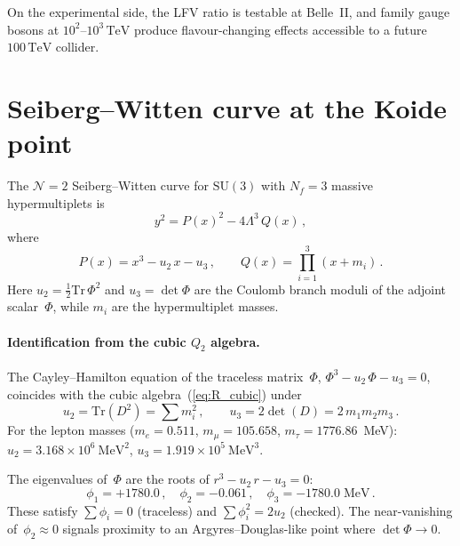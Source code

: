 \documentclass[12pt,a4paper]{article}
\newcommand{\SU}{\mathrm{SU}}
\newcommand{\Nf}{N_{\!f}}
\newcommand{\TeV}{\,\mathrm{TeV}}
\begin{document}
On the experimental side, the LFV ratio is testable at Belle~II,
and family gauge bosons at $10^2$--$10^3\TeV$ produce
flavour-changing effects accessible to a future $100\TeV$ collider.


\appendix

\section{Seiberg--Witten curve at the Koide point}
\label{app:SW}

The $\mathcal{N}{=}2$ Seiberg--Witten curve for $\SU(3)$ with
$\Nf = 3$ massive hypermultiplets is
\begin{equation}
  y^2 = P(x)^2 - 4\Lambda^3\,Q(x)\,,
  \label{eq:SWcurve}
\end{equation}
where
\begin{equation}
  P(x) = x^3 - u_2\,x - u_3\,,\qquad
  Q(x) = \prod_{i=1}^{3}(x + m_i)\,.
\end{equation}
Here $u_2 = \frac{1}{2}\mathrm{Tr}\,\Phi^2$ and
$u_3 = \det\Phi$ are the Coulomb branch moduli of the adjoint
scalar~$\Phi$, while $m_i$ are the hypermultiplet masses.

\paragraph{Identification from the cubic $Q_2$ algebra.}
The Cayley--Hamilton equation of the traceless matrix~$\Phi$,
$\Phi^3 - u_2\,\Phi - u_3 = 0$,
coincides with the cubic algebra~(\ref{eq:R_cubic}) under
\begin{equation}
  \boxed{u_2 = \mathrm{Tr}(D^2) = \sum m_i^2\,,\qquad
  u_3 = 2\det(D) = 2\,m_1 m_2 m_3\,.}
  \label{eq:u2u3}
\end{equation}
For the lepton masses ($m_e = 0.511$, $m_\mu = 105.658$,
$m_\tau = 1776.86$~MeV):
$u_2 = 3.168\times 10^6~\mathrm{MeV}^2$,
$u_3 = 1.919\times 10^5~\mathrm{MeV}^3$.

The eigenvalues of~$\Phi$ are the roots of
$r^3 - u_2\,r - u_3 = 0$:
\begin{equation}
  \phi_1 = +1780.0\,,\quad
  \phi_2 = -0.061\,,\quad
  \phi_3 = -1780.0\;\mathrm{MeV}\,.
\end{equation}
These satisfy $\sum\phi_i = 0$ (traceless) and
$\sum\phi_i^2 = 2u_2$ (checked).
The near-vanishing of~$\phi_2 \approx 0$ signals proximity to
an Argyres--Douglas-like point where $\det\Phi \to 0$.
\end{document}
